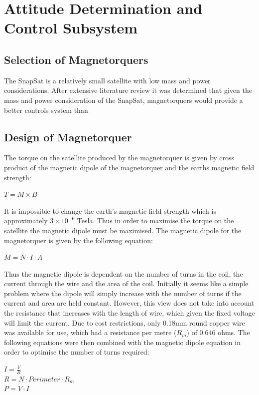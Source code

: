 \section{Attitude Determination and Control Subsystem}
\subsection{Selection of Magnetorquers}
The SnapSat is a relatively small satellite with low mass and power considerations.
After extensive literature review it was determined that given the mass and power consideration of the SnapSat, magnetorquers would provide a better controls system than 

\subsection{Design of Magnetorquer}
The torque on the satellite produced by the magnetorquer is given by cross product of the magnetic dipole of the magnetorquer and the earths magnetic field strength: 
\begin{center}
$T = M \times B$
\end{center}
It is impossible to change the earth's magnetic field strength which is approximately $3 \times 10^{-6}$ Tesla.  Thus in order to maximise the torque on the satellite the magnetic dipole must be maximised. The magnetic dipole for the magnetorquer is given by the following equation:
\begin{center}
$M = N \cdot I \cdot A$
\end{center}
Thus the magnetic dipole is dependent on the number of turns in the coil, the current through the wire and the area of the coil.  Initially it seems like a simple problem where the dipole will simply increase with the number of turns if the current and area are held constant.  However, this view does not take into account the resistance that increases with the length of wire, which given the fixed voltage will limit the current.  Due to cost restrictions, only 0.18mm round copper wire was available for use, which had a resistance per metre ($R_m$) of 0.646 ohms.  The following equations were then combined with the magnetic dipole equation in order to optimise the number of turns required:
\begin{center}
$I = \frac{V}{R}$\vspace{2mm}\\
$R = N \cdot Perimeter \cdot R_m$ \vspace{2mm}\\
$P = V \cdot I$
\end{center}
